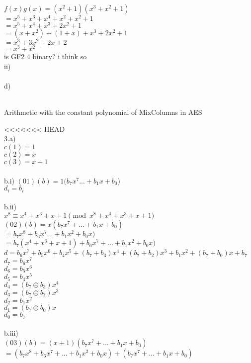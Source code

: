 \documentclass{assignment}
\begin{document}
\begin{problemlist}
\begin{problem}
\begin{answer}
$f(x)g(x)=(x^2+1)(x^3+x^2+1)$\\
$=x^5+x^3+x^4+x^2+x^2+1$\\
$=x^5+x^4+x^3+2x^2+1$\\
$=(x+x^2)+(1+x)+x^3+2x^2+1$\\
$=x^3+3x^2+2x+2$\\
$=x^3+x^2$\\  
is GF2 4  binary?   i think so
\\
ii)\\
\\
d)\\
\\
\end{answer}
\end{problem}

\pbitem Arithmetic with the constant polynomial of MixColumns in AES
\begin{problem}
\begin{answer}
<<<<<<< HEAD
\\
3.a)\\
$c(1)=1$\\
$c(2)=x$\\
$c(3)=x+1$\\
\\
b.i)   
$(01)(b)=1(b_7x^7...+b_1x+b_0$)\\
$d_i=b_i$\\
\\
b.ii)\\
$x^8\equiv x^4+x^3+x+1 \pmod {x^8+x^4+x^3+x+1}$\\
$(02)(b)=x(b_7x^7+...+b_1x+b_0)$\\
$=b_7x^8+b_6x^7...+b_1x^2+b_0x)$\\
$=b_7(x^4+x^3+x+1)+b_6x^7+...+b_1x^2+b_0x)$\\
$d=b_6x^7+b_5x^6+b_4x^5+(b_7+b_3)x^4+(b_7+b_2)x^3+b_1x^2+(b_7+b_0)x+b_7$\\
$d_7=b_6x^7$\\
$d_6=b_5x^6$\\
$d_5=b_4x^5$\\
$d_4=(b_7\oplus b_3)x^4$\\
$d_3=(b_7\oplus b_2)x^3$\\
$d_2=b_1x^2$\\
$d_1=(b_7\oplus b_0)x$\\
$d_0=b_7$\\
\\
b.iii)\\
$(03)(b)=(x+1)(b_7x^7+...+b_1x+b_0)$\\
$=(b_7x^8+b_6x^7+...+b_1x^2+b_0x)+(b_7x^7+...+b_1x+b_0)$\\

\end{answer}
\end{problem}
\end{problemlist}
\end{document}
